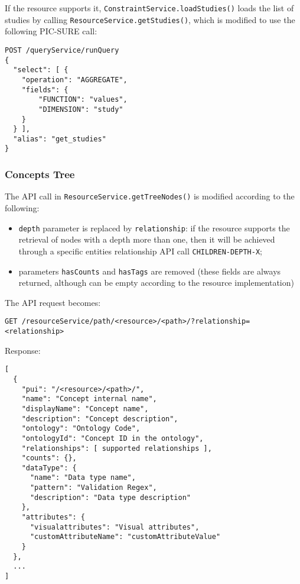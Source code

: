 If the resource supports it, \verb|ConstraintService.loadStudies()| loads the list of studies by calling \verb|ResourceService.getStudies()|, which is modified to use the following PIC-SURE call:
\begin{verbatim}
POST /queryService/runQuery
{
  "select": [ {
    "operation": "AGGREGATE",
    "fields": {
        "FUNCTION": "values",
        "DIMENSION": "study"
    }
  } ],
  "alias": "get_studies"
}
\end{verbatim}


\subsubsection{Concepts Tree}
\label{sec:gb-tree}

The API call in \verb|ResourceService.getTreeNodes()| is modified according to the following:
\begin{itemize}
     \item \verb|depth| parameter is replaced by \verb|relationship|: if the resource supports the retrieval of nodes with a depth more than one, then it will be achieved through a specific entities relationship API call \verb|CHILDREN-DEPTH-X|; 
    \item parameters \verb|hasCounts| and \verb|hasTags| are removed (these fields are always returned, although can be empty according to the resource implementation)
\end{itemize}

The API request becomes:
\begin{verbatim}
GET /resourceService/path/<resource>/<path>/?relationship=<relationship>
\end{verbatim}

Response:
\begin{verbatim}
[
  {
    "pui": "/<resource>/<path>/",
    "name": "Concept internal name",
    "displayName": "Concept name",
    "description": "Concept description",
    "ontology": "Ontology Code",
    "ontologyId": "Concept ID in the ontology",
    "relationships": [ supported relationships ],
    "counts": {},
    "dataType": {
      "name": "Data type name",
      "pattern": "Validation Regex",
      "description": "Data type description"
    },
    "attributes": {
      "visualattributes": "Visual attributes",
      "customAttributeName": "customAttributeValue"
    }
  },
  ...
]
\end{verbatim}

